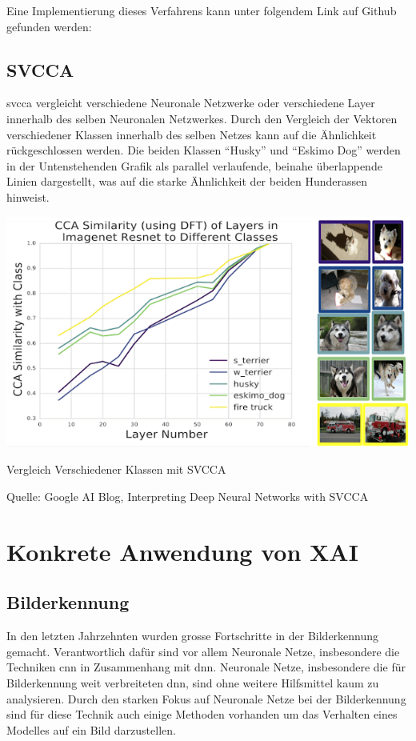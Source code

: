 \documentclass[
  12pt, %
  a4paper, %
  oneside, %
  openany, 
  numbers=noenddot, %
  BCOR=5mm, %
  parskip=half*, %
  thesis, %
]{bfhbook}
\begin{document}
Eine Implementierung dieses Verfahrens kann unter folgendem Link auf Github gefunden werden: \cite{tcavLink}

\section{SVCCA}
\acrlong{svcca} \parencite{Raghu2017} vergleicht verschiedene Neuronale Netzwerke oder verschiedene Layer innerhalb des selben Neuronalen Netzwerkes.
\break
Durch den Vergleich der Vektoren verschiedener Klassen innerhalb des selben Netzes kann auf die Ähnlichkeit rückgeschlossen werden. Die beiden Klassen ``Husky'' und ``Eskimo Dog'' werden in der Untenstehenden Grafik als parallel verlaufende, beinahe überlappende Linien dargestellt, was auf die starke Ähnlichkeit der beiden Hunderassen hinweist.
\begin{center}
\begin{minipage}[t]{\linewidth}
 	\includegraphics[width=\textwidth]{Bilder/svcca-similarities.png}
    	\caption{Vergleich Verschiedener Klassen mit SVCCA}
    	\caption*{Quelle: Google AI Blog, Interpreting Deep Neural Networks with SVCCA}
\end{minipage}
\end{center}
\cite{svccaLink}

\chapter{Konkrete Anwendung von XAI}

\section{Bilderkennung}
In den letzten Jahrzehnten wurden grosse Fortschritte in der Bilderkennung gemacht. Verantwortlich dafür sind vor allem Neuronale Netze, insbesondere die Techniken \acrfull{cnn} in Zusammenhang mit {dnn}. Neuronale Netze, insbesondere die für Bilderkennung weit verbreiteten \acrfull{dnn}, sind ohne weitere Hilfsmittel kaum zu analysieren.
Durch den starken Fokus auf Neuronale Netze bei der Bilderkennung sind für diese Technik auch einige Methoden vorhanden um das Verhalten eines Modelles  auf ein Bild darzustellen.
\end{document}
